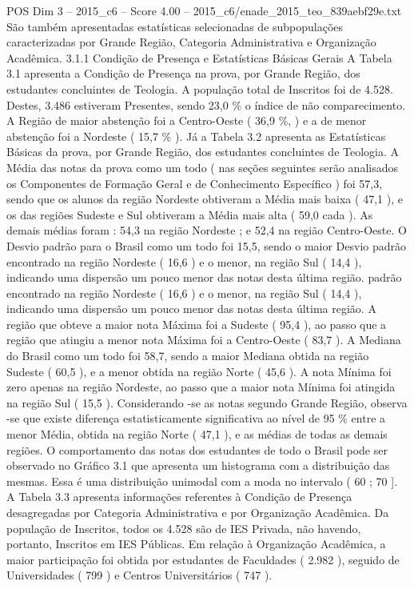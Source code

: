 \begin{textsample}{POS Dim 3 – 2015\_c6 – Score 4.00 – 2015\_c6/enade\_2015\_teo\_839aebf29e.txt}
São também apresentadas estatísticas selecionadas de subpopulações caracterizadas por Grande Região, Categoria Administrativa e Organização Acadêmica. 3.1.1 Condição de Presença e Estatísticas Básicas Gerais A Tabela 3.1 apresenta a Condição de Presença na prova, por Grande Região, dos estudantes concluintes de Teologia.
A população total de Inscritos foi de 4.528.
Destes, 3.486 estiveram Presentes, sendo 23,0 \% o índice de não comparecimento.
A Região de maior abstenção foi a Centro-Oeste ( 36,9 \%, ) e a de menor abstenção foi a Nordeste ( 15,7 \% ).
Já a Tabela 3.2 apresenta as Estatísticas Básicas da prova, por Grande Região, dos estudantes concluintes de Teologia.
A Média das notas da prova como um todo ( nas seções seguintes serão analisados os Componentes de Formação Geral e de Conhecimento Específico ) foi 57,3, sendo que os alunos da região Nordeste obtiveram a Média mais baixa ( 47,1 ), e os das regiões Sudeste e Sul obtiveram a Média mais alta ( 59,0 cada ).
As demais médias foram : 54,3 na região Nordeste ; e 52,4 na região Centro-Oeste.
O Desvio padrão para o Brasil como um todo foi 15,5, sendo o maior Desvio padrão encontrado na região Nordeste ( 16,6 ) e o menor, na região Sul ( 14,4 ), indicando uma dispersão um pouco menor das notas desta última região. padrão encontrado na região Nordeste ( 16,6 ) e o menor, na região Sul ( 14,4 ), indicando uma dispersão um pouco menor das notas desta última região.
A região que obteve a maior nota Máxima foi a Sudeste ( 95,4 ), ao passo que a região que atingiu a menor nota Máxima foi a Centro-Oeste ( 83,7 ).
A Mediana do Brasil como um todo foi 58,7, sendo a maior Mediana obtida na região Sudeste ( 60,5 ), e a menor obtida na região Norte ( 45,6 ).
A nota Mínima foi zero apenas na região Nordeste, ao passo que a maior nota Mínima foi atingida na região Sul ( 15,5 ).
Considerando -se as notas segundo Grande Região, observa -se que existe diferença estatisticamente significativa ao nível de 95 \% entre a menor Média, obtida na região Norte ( 47,1 ), e as médias de todas as demais regiões.
O comportamento das notas dos estudantes de todo o Brasil pode ser observado no Gráfico 3.1 que apresenta um histograma com a distribuição das mesmas.
Essa é uma distribuição unimodal com a moda no intervalo ( 60 ; 70 ].
A Tabela 3.3 apresenta informações referentes à Condição de Presença desagregadas por Categoria Administrativa e por Organização Acadêmica.
Da população de Inscritos, todos os 4.528 são de IES Privada, não havendo, portanto, Inscritos em IES Públicas.
Em relação à Organização Acadêmica, a maior participação foi obtida por estudantes de Faculdades ( 2.982 ), seguido de Universidades ( 799 ) e Centros Universitários ( 747 ).

\end{textsample}
